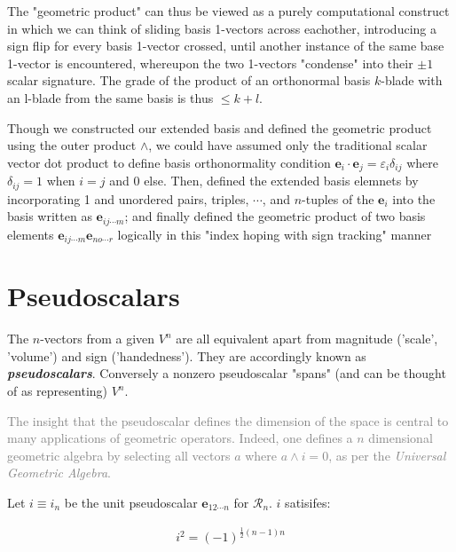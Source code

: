 \documentclass[a4paper]{book}
\numberwithin{equation}{chapter}
\begin{document}
The "geometric product" can thus be viewed as a purely computational construct in 
which we can think of sliding basis 1-vectors across eachother, introducing a sign 
flip for every basis 1-vector crossed, until another instance of the same base 
1-vector is encountered, whereupon the two 1-vectors "condense" into their 
$\pm1$ scalar signature. The grade of the product of an orthonormal basis $k$-blade
with an l-blade from the same basis is thus $\le k+l$.

 \vspace{\baselineskip}
 
Though we constructed our extended basis and defined the geometric product using the
outer product $\wedge$, we could have assumed only the traditional scalar vector dot
product to define basis orthonormality condition
$\mathbf{e}_i \cdot \mathbf{e}_j = \varepsilon_i \delta_{ij}$ 
where $\delta_{ij} = 1$ when $i=j$ and 0 else. 
Then, defined the extended basis elemnets by incorporating 1 and unordered 
pairs, triples, $\cdots$, and $n$-tuples of the 
$\mathbf{e}_i$ into the basis written as $\mathbf{e}_{ij\cdots m}$; and 
finally defined the geometric product of two basis elements 
$\mathbf{e}_{ij\cdots m}\mathbf{e}_{no\cdots r}$ 
logically in this "index hoping with sign tracking" manner

    \section{Pseudoscalars}

The $n$-vectors from a given $V^n$ are all equivalent apart from magnitude 
('scale', 'volume') and sign ('handedness'). They are accordingly known as 
\textbf{\emph{pseudoscalars}}. 
Conversely a nonzero pseudoscalar "spans" (and can be thought of as 
representing) $V^n$.

\textcolor{gray}{The insight that the pseudoscalar defines the dimension
of the space is central to many applications of geometric operators. Indeed,
one defines a $n$ dimensional geometric algebra by selecting all
vectors $a$ where $a\wedge i = 0$, as per the \emph{Universal Geometric Algebra}.}

 \vspace{\baselineskip}
 
Let $i \equiv i_n$ be the unit pseudoscalar $\mathbf{e}_{12\cdots n}$ 
for $\mathcal{R}_n$. $i$ satisifes:

\begin{align*}
    i^2 = (-1)^{\frac{1}{2}(n-1)n}
\end{align*}
\end{document}
